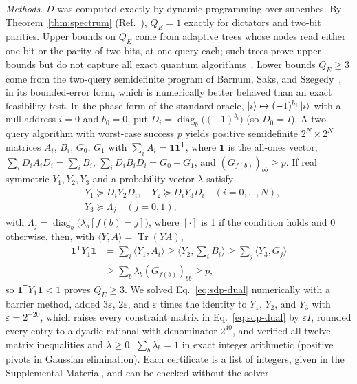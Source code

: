 \documentclass[
  aps,
  pra,
  reprint,
  nofootinbib
]{revtex4-2}
\begin{document}
\emph{Methods.} \(D\) was computed exactly by dynamic programming over
subcubes. By Theorem~\ref{thm:spectrum} (Ref.~\cite{ChenYeLi2020}),
\(Q_E=1\) exactly for dictators and two-bit parities. Upper bounds on \(Q_E\)
come from adaptive trees whose nodes read either one bit or the parity of two
bits, at one query each; such trees prove upper bounds but do not capture all
exact quantum algorithms~\cite{MontanaroJozsaMitchison2015}. Lower bounds
\(Q_E\ge3\) come from the two-query semidefinite program of Barnum, Saks, and
Szegedy~\cite{BarnumSaksSzegedy2003}, in its bounded-error form, which is
numerically better behaved than an exact feasibility test. In the phase form of the
standard oracle, \(\ket i\mapsto(-1)^{b_i}\ket i\) with a null address \(i=0\) and
\(b_0=0\), put \(D_i=\operatorname{diag}_b\bigl((-1)^{b_i}\bigr)\) (so
\(D_0=I\)). A two-query algorithm with worst-case success \(p\) yields
positive semidefinite \(2^N\times2^N\) matrices \(A_i\), \(B_i\), \(G_0\),
\(G_1\) with \(\sum_iA_i=\mathbf 1\mathbf 1^{\mathsf T}\), where
\(\mathbf 1\) is the all-ones vector, \(\sum_iD_iA_iD_i=\sum_iB_i\),
\(\sum_iD_iB_iD_i=G_0+G_1\), and \((G_{f(b)})_{bb}\ge p\). If
real symmetric \(Y_1,Y_2,Y_3\) and a probability vector \(\lambda\) satisfy
\begin{equation}
\begin{aligned}
 &Y_1\succeq D_iY_2D_i,\quad Y_2\succeq D_iY_3D_i\quad(i=0,\dots,N),\\
 &Y_3\succeq\Lambda_j\quad(j=0,1),
\end{aligned}
 \label{eq:sdp-dual}
\end{equation}
with \(\Lambda_j=\operatorname{diag}_b\bigl(\lambda_b[f(b)=j]\bigr)\), where
\([\cdot]\) is 1 if the condition holds and 0 otherwise, then, with
\(\langle Y,A\rangle=\operatorname{Tr}(YA)\),
\begin{equation}
\begin{aligned}
 \mathbf 1^{\mathsf T}Y_1\mathbf 1&=\textstyle\sum_i\langle Y_1,A_i\rangle
 \ge\langle Y_2,\textstyle\sum_iB_i\rangle
 \ge\textstyle\sum_j\langle Y_3,G_j\rangle\\
 &\ge\textstyle\sum_b\lambda_b(G_{f(b)})_{bb}\ge p ,
\end{aligned}
 \label{eq:weak-duality}
\end{equation}
so \(\mathbf 1^{\mathsf T}Y_1\mathbf 1<1\) proves \(Q_E\ge3\). We solved
Eq.~\eqref{eq:sdp-dual} numerically with a barrier method, added
\(3\varepsilon\), \(2\varepsilon\), and \(\varepsilon\) times the identity to
\(Y_1\), \(Y_2\), and \(Y_3\) with \(\varepsilon=2^{-20}\), which raises every
constraint matrix in Eq.~\eqref{eq:sdp-dual} by \(\varepsilon I\), rounded
every entry to a dyadic rational with denominator \(2^{40}\), and verified all
twelve matrix inequalities and \(\lambda\ge0\), \(\sum_b\lambda_b=1\) in exact
integer arithmetic (positive pivots in Gaussian
elimination). Each certificate is a list of integers, given in the
Supplemental Material, and can be checked without the solver.
\end{document}
